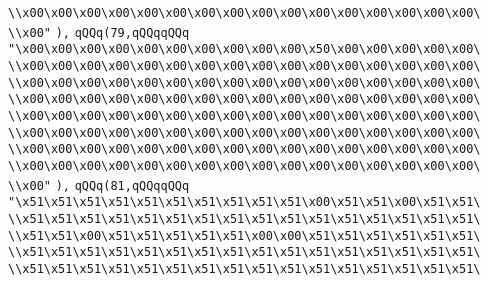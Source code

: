 \verb|\\x00\x00\x00\x00\x00\x00\x00\x00\x00\x00\x00\x00\x00\x00\x00\x00\|\newline
\verb|\\x00"|\newline
\verb|),|\newline
\verb|qQQq(79,qQQqqQQq|\newline
\verb|"\x00\x00\x00\x00\x00\x00\x00\x00\x00\x00\x50\x00\x00\x00\x00\x00\|\newline
\verb|\\x00\x00\x00\x00\x00\x00\x00\x00\x00\x00\x00\x00\x00\x00\x00\x00\|\newline
\verb|\\x00\x00\x00\x00\x00\x00\x00\x00\x00\x00\x00\x00\x00\x00\x00\x00\|\newline
\verb|\\x00\x00\x00\x00\x00\x00\x00\x00\x00\x00\x00\x00\x00\x00\x00\x00\|\newline
\verb|\\x00\x00\x00\x00\x00\x00\x00\x00\x00\x00\x00\x00\x00\x00\x00\x00\|\newline
\verb|\\x00\x00\x00\x00\x00\x00\x00\x00\x00\x00\x00\x00\x00\x00\x00\x00\|\newline
\verb|\\x00\x00\x00\x00\x00\x00\x00\x00\x00\x00\x00\x00\x00\x00\x00\x00\|\newline
\verb|\\x00\x00\x00\x00\x00\x00\x00\x00\x00\x00\x00\x00\x00\x00\x00\x00\|\newline
\verb|\\x00"|\newline
\verb|),|\newline
\verb|qQQq(81,qQQqqQQq|\newline
\verb|"\x51\x51\x51\x51\x51\x51\x51\x51\x51\x51\x00\x51\x51\x00\x51\x51\|\newline
\verb|\\x51\x51\x51\x51\x51\x51\x51\x51\x51\x51\x51\x51\x51\x51\x51\x51\|\newline
\verb|\\x51\x51\x00\x51\x51\x51\x51\x51\x00\x00\x51\x51\x51\x51\x51\x51\|\newline
\verb|\\x51\x51\x51\x51\x51\x51\x51\x51\x51\x51\x51\x51\x51\x51\x51\x51\|\newline
\verb|\\x51\x51\x51\x51\x51\x51\x51\x51\x51\x51\x51\x51\x51\x51\x51\x51\|\newline
